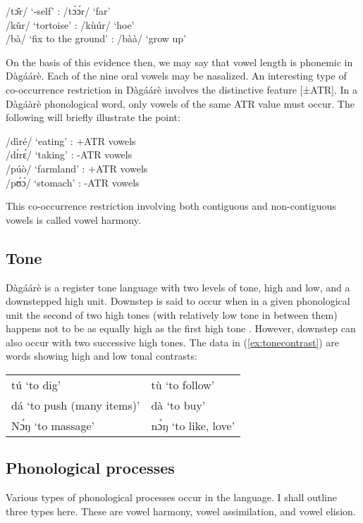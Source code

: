\begin{refsection}
\ea /tɔ̌r/ ‘-self’ : /tɔ̀ɔ́r/ ‘far’\\
/kǔr/ ‘tortoise’ : /kùúr/ ‘hoe’\\
/bà/ ‘fix to the ground’ : /bàà/ ‘grow up’
\z



On the basis of this evidence then, we may say that vowel length is phonemic in Dàgáárè. Each of the nine oral vowels may be nasalized. An interesting type of co-occurrence restriction in Dàgáárè involves the distinctive feature [±ATR]. In a Dàgáàrè phonological word, only vowels of the same ATR value must occur. The following will briefly illustrate the point:


\ea \label{ex:vowelharmony}/dìré/ ‘eating’ : +ATR vowels\\
/dɪ́rɛ́/ ‘taking’ : -ATR vowels\\
/púò/ ‘farmland’ : +ATR vowels\\
/pʊ́ɔ́/ ‘stomach’ : -ATR vowels\\
\z

This co-occurrence restriction involving both contiguous and non-contiguous vowels is called vowel harmony.

\subsection{Tone}
Dàgáárè is a register tone language with two levels of tone, high and low, and a
downstepped high unit. Downstep is said to occur when in a given phonological unit the
second of two high tones (with relatively low tone in between them) happens not to be as
equally high as the first high tone \citep{Kennedy1966}. However, downstep can also occur with two successive high tones. The data in 
(\ref{ex:tonecontrast}) are words showing high and low tonal contrasts:

\ea \label{ex:tonecontrast} \begin{tabular}{ll}
tú ‘to dig' &tù ‘to follow’  \\
dá ‘to push (many items)’ & dà ‘to buy’\\
Nɔ́ŋ ‘to massage’ &nɔ̀ŋ ‘to like, love’
\end{tabular} 
\z
\subsection{Phonological processes}

Various types of phonological processes occur in the language. I shall
outline three types here. These are vowel harmony, vowel assimilation, and vowel elision.


\end{refsection}
